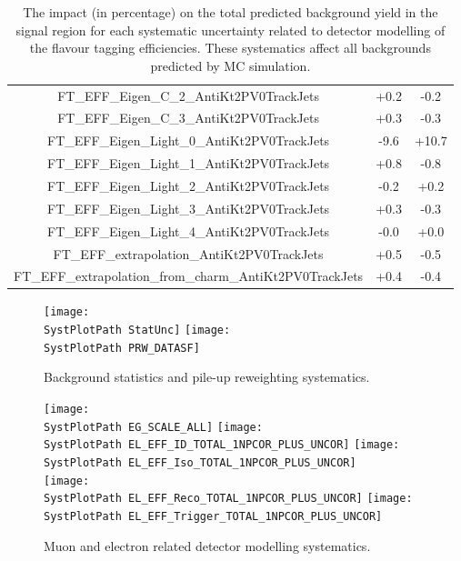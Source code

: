 \begin{table}[htbp!]
\begin{center}
\begin{tabular}{c|c|c}
FT\_EFF\_Eigen\_C\_2\_AntiKt2PV0TrackJets                    &     +0.2 &     -0.2  \\
FT\_EFF\_Eigen\_C\_3\_AntiKt2PV0TrackJets                    &     +0.3 &     -0.3  \\
FT\_EFF\_Eigen\_Light\_0\_AntiKt2PV0TrackJets                &     -9.6 &    +10.7  \\
FT\_EFF\_Eigen\_Light\_1\_AntiKt2PV0TrackJets                &     +0.8 &     -0.8  \\
FT\_EFF\_Eigen\_Light\_2\_AntiKt2PV0TrackJets                &     -0.2 &     +0.2  \\
FT\_EFF\_Eigen\_Light\_3\_AntiKt2PV0TrackJets                &     +0.3 &     -0.3  \\
FT\_EFF\_Eigen\_Light\_4\_AntiKt2PV0TrackJets                &     -0.0 &     +0.0  \\
FT\_EFF\_extrapolation\_AntiKt2PV0TrackJets                  &     +0.5 &     -0.5  \\
FT\_EFF\_extrapolation\_from\_charm\_AntiKt2PV0TrackJets     &     +0.4 &     -0.4  \\
\end{tabular}
\end{center}
\caption{The impact (in percentage) on the total predicted background yield in the 
signal region for each systematic uncertainty related to detector modelling of the 
flavour tagging efficiencies. These systematics affect all backgrounds predicted by 
MC simulation.} 
\label{tab:boosted_systematics_det2_sr_background}
\end{table}

\newcommand*{\SystPlotPath}{./figures/boosted/SystPlots/TotalBkgd_2tag0bjet_hhMass_}

\begin{figure}[!h]
\begin{center}
\texttt{[image: \\SystPlotPath StatUnc]}
\texttt{[image: \\SystPlotPath PRW\_DATASF]}   
\caption{Background statistics and pile-up reweighting systematics.}
\label{fig:systplots_event}
\end{center}
\end{figure}

\begin{figure}[!h]
\begin{center}
\texttt{[image: \\SystPlotPath EG\_SCALE\_ALL]}                       
\texttt{[image: \\SystPlotPath EL\_EFF\_ID\_TOTAL\_1NPCOR\_PLUS\_UNCOR]}   
\texttt{[image: \\SystPlotPath EL\_EFF\_Iso\_TOTAL\_1NPCOR\_PLUS\_UNCOR]} \\
\texttt{[image: \\SystPlotPath EL\_EFF\_Reco\_TOTAL\_1NPCOR\_PLUS\_UNCOR]}   
\texttt{[image: \\SystPlotPath EL\_EFF\_Trigger\_TOTAL\_1NPCOR\_PLUS\_UNCOR]} 
\caption{Muon and electron related detector modelling systematics.}
\label{fig:systplots_lepton}
\end{center}
\end{figure}

